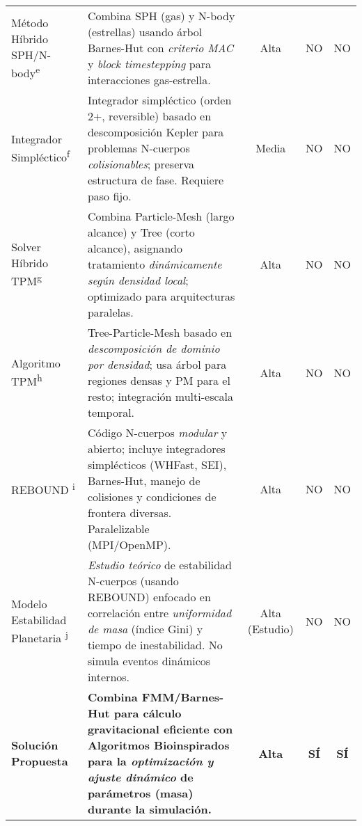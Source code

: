 \begin{ThreePartTable}
\begin{longtable}{@{}p{0.8\firstcolwidth}p{0.9\desccolwidth}ccc@{}}
    \addlinespace[3pt]
    Método Híbrido SPH/N-body\textsuperscript{e}
    & Combina SPH (gas) y N-body (estrellas) usando árbol Barnes-Hut con \textit{criterio MAC} y \textit{block timestepping} para interacciones gas-estrella.
    & Alta
    & NO
    & NO \\

    \addlinespace[3pt]
    Integrador Simpléctico\textsuperscript{f}
    & Integrador simpléctico (orden 2+, reversible) basado en descomposición Kepler para problemas N-cuerpos \textit{colisionables}; preserva estructura de fase. Requiere paso fijo.
    & Media
    & NO
    & NO \\

    \addlinespace[3pt]
    Solver Híbrido TPM\textsuperscript{g}
    & Combina Particle-Mesh (largo alcance) y Tree (corto alcance), asignando tratamiento \textit{dinámicamente según densidad local}; optimizado para arquitecturas paralelas.
    & Alta
    & NO
    & NO \\

    \addlinespace[3pt]
    Algoritmo TPM\textsuperscript{h}
    & Tree-Particle-Mesh basado en \textit{descomposición de dominio por densidad}; usa árbol para regiones densas y PM para el resto; integración multi-escala temporal.
    & Alta
    & NO
    & NO \\

    \addlinespace[3pt]
    REBOUND \textsuperscript{i}
    & Código N-cuerpos \textit{modular} y abierto; incluye integradores simplécticos (WHFast, SEI), Barnes-Hut, manejo de colisiones y condiciones de frontera diversas. Paralelizable (MPI/OpenMP).
    & Alta
    & NO
    & NO \\

    \addlinespace[3pt]
    Modelo Estabilidad Planetaria \textsuperscript{j}
    & \textit{Estudio teórico} de estabilidad N-cuerpos (usando REBOUND) enfocado en correlación entre \textit{uniformidad de masa} (índice Gini) y tiempo de inestabilidad. No simula eventos dinámicos internos.
    & Alta (Estudio)
    & NO
    & NO \\

    \midrule
    \textbf{Solución Propuesta}
    & \textbf{Combina FMM/Barnes-Hut para cálculo gravitacional eficiente con Algoritmos Bioinspirados para la \textit{optimización y ajuste dinámico} de parámetros (masa) durante la simulación.}
    & \textbf{Alta}
    & \textbf{SÍ}
    & \textbf{SÍ} \\

\end{longtable}
\end{ThreePartTable}